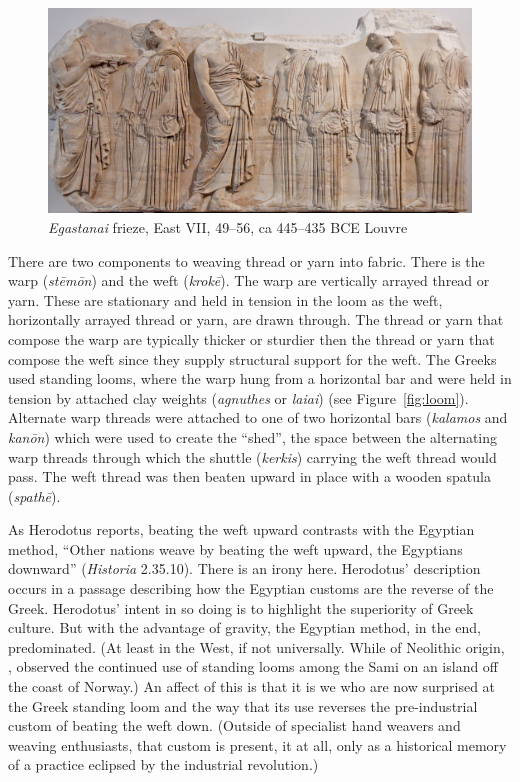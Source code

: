 \begin{figure}[htbp]
     \centering
         \includegraphics[scale=1.4]{graphics/egastinai_frieze.jpg}
     \caption{\emph{Egastanai} frieze, East VII, 49--56, ca 445--435 BCE Louvre}
     \label{fig:frieze}
\end{figure}

There are two components to weaving thread or yarn into fabric. There is the warp (\emph{stēmōn}) and the weft (\emph{krokē}). The warp are vertically arrayed thread or yarn. These are stationary and held in tension in the loom as the weft, horizontally arrayed thread or yarn, are drawn through. The thread or yarn that compose the warp are typically thicker or sturdier then the thread or yarn that compose the weft since they supply structural support for the weft. The Greeks used standing looms, where the warp hung from a horizontal bar and were held in tension by attached clay weights (\emph{agnuthes} or \emph{laiai}) (see Figure~\ref{fig:loom}). Alternate warp threads were attached to one of two horizontal bars (\emph{kalamos} and \emph{kanōn}) which were used to create the ``shed'', the space between the alternating warp threads through which the shuttle (\emph{kerkis}) carrying the weft thread would pass. The weft thread was then beaten upward in place with a wooden spatula (\emph{spathē}). 

As Herodotus reports, beating the weft upward contrasts with the Egyptian method, ``Other nations weave by beating the weft upward, the Egyptians downward'' (\emph{Historia} 2.35.10). There is an irony here. Herodotus' description occurs in a passage describing how the Egyptian customs are the reverse of the Greek. Herodotus' intent in so doing is to highlight the superiority of Greek culture. But with the advantage of gravity, the Egyptian method, in the end, predominated. (At least in the West, if not universally. While of Neolithic origin, \citealt[1--2]{Hoffmann:1964aa}, observed the continued use of standing looms among the Sami on an island off the coast of Norway.) An affect of this is that it is we who are now surprised at the Greek standing loom and the way that its use reverses the pre-industrial custom of beating the weft down. (Outside of specialist hand weavers and weaving enthusiasts, that custom is present, it at all, only as a historical memory of a practice eclipsed by the industrial revolution.)

